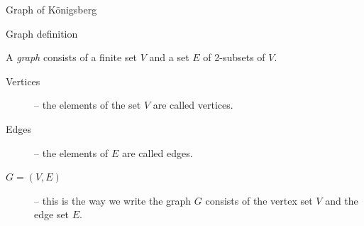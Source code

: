 \begin{frame}{Graph of K{\"o}nigsberg}
  \begin{adjustbox}{max width={0.9\textwidth},center} 
  \end{adjustbox}
\end{frame}

\begin{frame}{Graph definition}
	\begin{definition}
	A \emph{graph} consists of a finite set $V$ and a set $E$ of 2-subsets of $V$.
	\end{definition}
	\vspace{0.5cm}
	\begin{description}
		\item[Vertices] -- the elements of the set $V$ are called vertices.
		\vspace{0.25cm}
		\item[Edges] -- the elements of $E$ are called edges.
		\vspace{0.25cm}
		\item[$G = (V,E)$] -- this is the way we write the graph $G$ consists of the vertex set $V$ and the edge set $E$.
	\end{description}
\end{frame}


